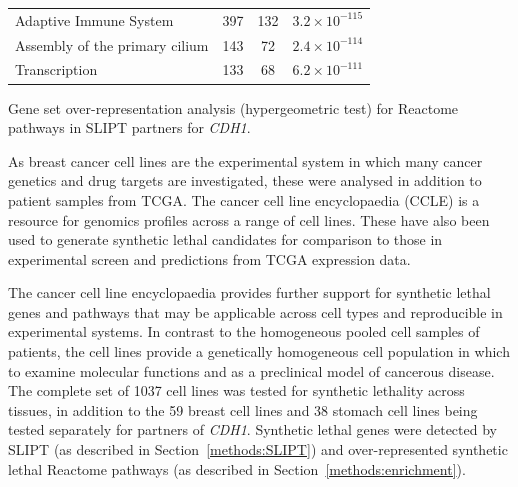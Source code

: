 \begin{table}[!b]
{\begin{threeparttable}
\begin{tabular}{lccc}
  \rowcolor{black!5}
  Adaptive Immune System & 397 & 132 & $3.2 \times 10^{-115}$ \\ 
  \rowcolor{black!10}
  Assembly of the primary cilium & 143 &  72 & $2.4 \times 10^{-114}$ \\ 
  \rowcolor{black!5}
  Transcription & 133 &  68 & $6.2 \times 10^{-111}$ \\ 
   \hline
\end{tabular}
\begin{tablenotes}
\raggedright \small
Gene set over-representation analysis (hypergeometric test) for Reactome pathways in \gls{SLIPT} partners for \textit{CDH1}.
\end{tablenotes}
\end{threeparttable}
}
\end{table}

As breast cancer cell lines are the experimental system in which many cancer genetics and drug targets are investigated, these were analysed in addition to patient samples from TCGA. The cancer cell line encyclopaedia (CCLE) is a resource for genomics profiles across a range of cell lines. These have also been used to generate synthetic lethal candidates for comparison to those in experimental screen and predictions from TCGA expression data.

The cancer cell line encyclopaedia provides further support for synthetic lethal genes and pathways that may be applicable across cell types and reproducible in experimental systems. In contrast to the homogeneous pooled cell samples of patients,  the cell lines provide a genetically homogeneous cell population in which to examine molecular functions and as a preclinical model of cancerous disease. The complete set of 1037 cell lines was tested for synthetic lethality across tissues, in addition to the 59 breast cell lines and 38 stomach cell lines being tested separately for partners of \textit{CDH1}. Synthetic lethal genes were detected by \gls{SLIPT} (as described in Section~\ref{methods:SLIPT}) and over-represented synthetic lethal Reactome pathways (as described in Section~\ref{methods:enrichment}). 

